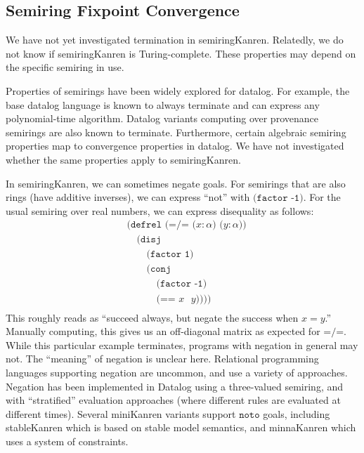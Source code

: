 \documentclass{report}
\theoremstyle{definition}
\begin{document}
\subsection{Semiring Fixpoint Convergence}

We have not yet investigated termination in semiringKanren.
Relatedly, we do not know if semiringKanren is Turing-complete.
These properties may depend on the specific semiring in use.

Properties of semirings have been widely explored for datalog.
For example, the base datalog language is known to always terminate and can express any polynomial-time algorithm\cite{madsen2020}.
Datalog variants computing over provenance semirings are also known to terminate\cite{green2007}.
Furthermore, certain algebraic semiring properties map to convergence properties in datalog\cite{khamis2024}.
We have not investigated whether the same properties apply to semiringKanren.

In semiringKanren, we can sometimes negate goals.
For semirings that are also rings (have additive inverses), we can express ``not'' with \(\texttt{(factor -1)}\).
For the usual semiring over real numbers, we can express disequality as follows:
\begin{equation}
\begin{aligned}
	& \texttt{(defrel (=/= (\(x : \alpha\)) (\(y : \alpha\)))} \\
	& \quad \texttt{(disj} \\
	& \quad\quad \texttt{(factor 1)} \\
	& \quad\quad \texttt{(conj} \\
	& \quad\quad\quad \texttt{(factor -1)} \\
	& \quad\quad\quad \texttt{(== \(x\) \(y\)))))} \\
\end{aligned}
\end{equation}
This roughly reads as ``succeed always, but negate the success when \(x = y\).''
Manually computing, this gives us an off-diagonal matrix as expected for \(\texttt{=/=}\).
While this particular example terminates, programs with negation in general may not.
The ``meaning'' of negation is unclear here.
Relational programming languages supporting negation are uncommon, and use a variety of approaches.
Negation has been implemented in Datalog using a three-valued semiring, and with ``stratified'' evaluation approaches (where different rules are evaluated at different times).
Several miniKanren variants support \(\texttt{noto}\) goals, including stableKanren\cite{guo2023} which is based on stable model semantics,
and minnaKanren\cite{donahue2023} which uses a system of constraints.
\end{document}
